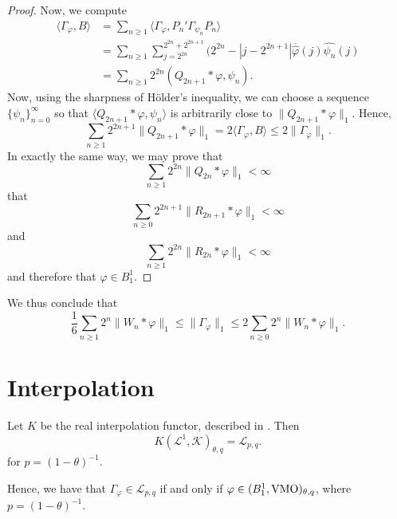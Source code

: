 \begin{proof}
    Now, we compute
    \begin{align*}
        \langle \Gamma_\varphi,B \rangle &= \sum_{n\geq 1} \langle \Gamma_\varphi,P_n'\Gamma_{\psi_n}P_n\rangle\\
        &= \sum_{n\geq 1} \sum_{j=2^{2n}}^{2^{2n}+2^{2n+1}}(2^{2n}-|j-2^{2n+1}|\overline{\widehat{\varphi}}(j)\widehat{\psi_n}(j)\\
        &= \sum_{n\geq 1} 2^{2n} (Q_{2n+1}*\varphi,\psi_n).
    \end{align*}
    Now, using the sharpness of H\"older's inequality, we can choose
    a sequence $\{\psi_n\}_{n=0}^\infty$ so that $\langle Q_{2n+1}*\varphi,\psi_n\rangle$
    is arbitrarily close to $\|Q_{2n+1}*\varphi\|_1$. Hence,
    \begin{equation*}
        \sum_{n\geq 1}2^{2n+1}\|Q_{2n+1}*\varphi\|_1 = 2\langle \Gamma_\varphi,B\rangle \leq 2\|\Gamma_\varphi\|_1.
    \end{equation*}
    In exactly the same way, we may prove that
    \begin{equation*}
        \sum_{n\geq 1}2^{2n}\|Q_{2n}*\varphi\|_1 < \infty
    \end{equation*} 
    that
    \begin{equation*}
        \sum_{n\geq 0} 2^{2n+1} \|R_{2n+1}*\varphi\|_1 < \infty
    \end{equation*}
    and
    \begin{equation*}
        \sum_{n\geq 1} 2^{2n}\|R_{2n}*\varphi\|_1 < \infty
    \end{equation*}
    and therefore that $\varphi \in B_1^1$.
\end{proof} 

\begin{remark}
    We thus conclude that
    \begin{equation*}
        \frac{1}{6}\sum_{n\geq 1}2^n \|W_n*\varphi\|_1 \leq \|\Gamma_\varphi\|_1 \leq 2\sum_{n\geq 0} 2^n\|W_n*\varphi\|_1.
    \end{equation*}
\end{remark}

\section{Interpolation}
\begin{lemma}
    Let $K$ be the real interpolation functor, described in \cite{interp}. Then
    \begin{equation*}
        K(\mathcal{L}^1,\mathcal{K})_{\theta,q} = \mathcal{L}_{p,q}.
    \end{equation*} 
    for $p = (1-\theta)^{-1}$.
\end{lemma}


\begin{corollary}
    Hence, we have that $\Gamma_\varphi \in \mathcal{L}_{p,q}$
    if and only if $\varphi \in (B_1^1,\operatorname{VMO})_{\theta,q}$, where $p = (1-\theta)^{-1}$.
\end{corollary}

